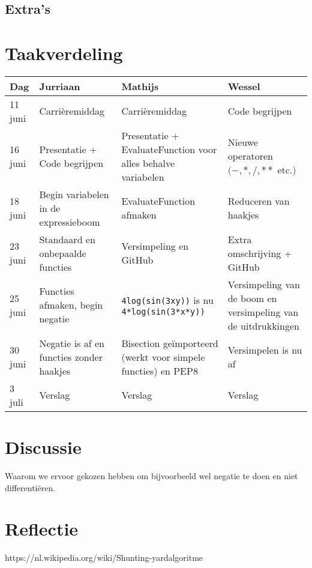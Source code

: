 \documentclass[12pt]{article}
\begin{document}
\subsection{Extra's}

\newpage
\section{Taakverdeling}

\begin{center}
    \begin{tabular}{ | l | p{4cm}  | p{4cm} | p{4cm} |}
    \hline
    Dag & Jurriaan & Mathijs & Wessel \\ \hline
    11 juni & Carri\`eremiddag & Carri\`eremiddag & Code begrijpen \\ \hline
    16 juni & Presentatie + Code begrijpen & Presentatie + EvaluateFunction voor alles behalve variabelen & Nieuwe operatoren  $(-, *, /, **$ etc.$)$ \\ \hline
    18 juni & Begin variabelen in de expressieboom & EvaluateFunction afmaken & Reduceren van haakjes \\ \hline
    23 juni & Standaard en onbepaalde functies & Versimpeling en GitHub & Extra omschrijving + GitHub \\ \hline
    25 juni & Functies afmaken, begin negatie & \texttt{4log(sin(3xy))} is nu \texttt{4*log(sin(3*x*y))} & Versimpeling van de boom en versimpeling van de uitdrukkingen \\ \hline
    30 juni & Negatie is af en functies zonder haakjes & Bisection ge\"{i}mporteerd (werkt voor simpele functies) en PEP8 & Versimpelen is nu af \\ \hline
    3 juli & Verslag & Verslag & Verslag \\
    \hline
    \end{tabular}
\end{center}

\section{Discussie}
Waarom we ervoor gekozen hebben om bijvoorbeeld wel negatie te doen en niet differenti\"eren.


\section{Reflectie}

\begin{thebibliography}{9}
https://nl.wikipedia.org/wiki/Shunting-yardalgoritme
\end{thebibliography}
\end{document}

